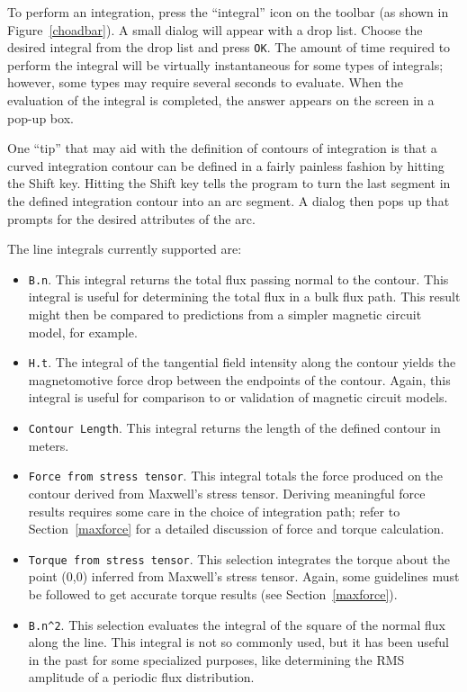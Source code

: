 \documentclass[12pt]{report}
\begin{document}
To perform an integration, press the ``integral'' icon on the
toolbar (as shown in Figure~\ref{choadbar}).  A small dialog will
appear with a drop list.  Choose the desired integral from the drop
list and press {\tt OK}.  The amount of time required to perform
the integral will be virtually instantaneous for some types of
integrals; however, some types may require several seconds to
evaluate.  When the evaluation of the integral is completed, the
answer appears on the screen in a pop-up box.

One ``tip'' that may aid with the definition of contours of integration is
that a curved integration contour can be defined in a fairly painless
fashion by hitting the Shift key.  Hitting the Shift key tells the program
to turn the last segment in the defined integration contour into an arc
segment.  A dialog then pops up that prompts for the desired attributes of
the arc.

The line integrals currently supported are:
\begin{itemize}
\item {\tt B.n}.  This integral returns the total flux passing normal
to the contour.  This integral is useful for determining the total
flux in a bulk flux path.  This result might then be compared to
predictions from a simpler magnetic circuit model, for example.
\item {\tt H.t}. The integral of the tangential field intensity along
the contour yields the magnetomotive force drop between the
endpoints of the contour.  Again, this integral is useful for
comparison to or validation of magnetic circuit models.
\item {\tt Contour Length}.  This integral returns the length of
the defined contour in meters.
\item {\tt Force from stress tensor}.  This integral totals the
force produced on the contour derived from Maxwell's stress tensor.
Deriving meaningful force results requires some care in the choice
of integration path; refer to Section~\ref{maxforce} for a detailed
discussion of force and torque calculation.
\item {\tt Torque from stress tensor}.  This selection integrates
the torque about the point (0,0) inferred from Maxwell's stress
tensor.  Again, some guidelines must be followed to get accurate
torque results (see Section~\ref{maxforce}).
\item \verb+B.n^2+.  This selection evaluates the integral of the
square of the normal flux along the line.  This integral is not so
commonly used, but it has been useful in the past for some
specialized purposes, like determining the RMS amplitude of a
periodic flux distribution.
\end{itemize}
\end{document}
